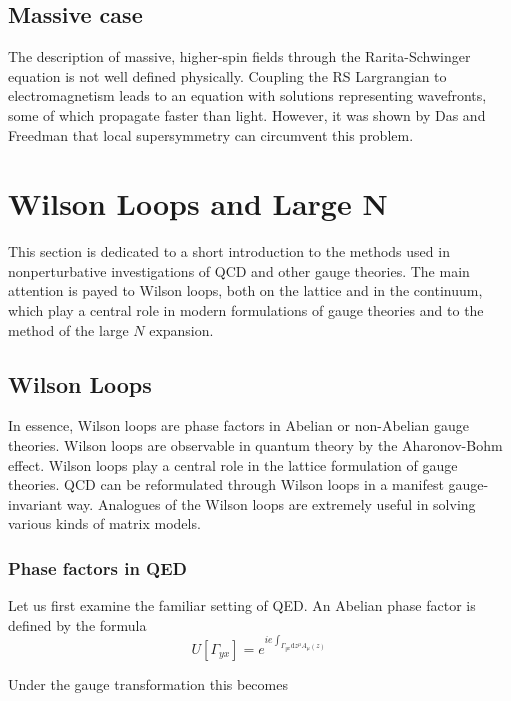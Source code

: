 \subsection{Massive case}
The description of massive, higher-spin fields through the Rarita-Schwinger
equation is not well defined physically. Coupling the RS Largrangian to
electromagnetism leads to an equation with solutions representing wavefronts,
some of which propagate faster than light. However, it was shown by Das and
Freedman that local supersymmetry can circumvent this problem.



\section{Wilson Loops and Large N}
This section is dedicated to a short introduction to the methods used in
nonperturbative investigations of QCD and other gauge theories. The main
attention is payed to Wilson loops, both on the lattice and in the continuum,
which play a central role in modern formulations of gauge theories and to the
method of the large $N$ expansion.

\subsection{Wilson Loops}
In essence, Wilson loops are phase factors in Abelian or non-Abelian gauge
theories. Wilson loops are observable in quantum theory by the Aharonov-Bohm
effect. Wilson loops play a central role in the lattice formulation of gauge
theories. QCD can be reformulated through Wilson loops in a manifest
gauge-invariant way. Analogues of the Wilson loops are extremely useful in
solving various kinds of matrix models.
\subsubsection{Phase factors in QED}
\par Let us first examine the familiar setting of QED. An Abelian phase factor
is defined by the formula
\begin{equation}
  U\left[\Gamma_{yx}\right] = e^{ie\int_{\Gamma_{yx}\mathrm{d}z^\mu
  A_\mu(z)}}
  \label{eq:abelianphasefactor}
\end{equation}

Under the gauge transformation this becomes

